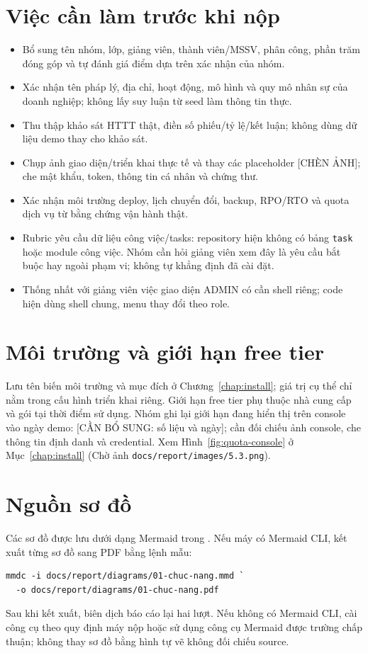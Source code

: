 \section{Việc cần làm trước khi nộp}
\begin{itemize}
\item Bổ sung tên nhóm, lớp, giảng viên, thành viên/MSSV, phân công, phần trăm đóng góp và tự đánh giá điểm dựa trên xác nhận của nhóm.
\item Xác nhận tên pháp lý, địa chỉ, hoạt động, mô hình và quy mô nhân sự của doanh nghiệp; không lấy suy luận từ seed làm thông tin thực.
\item Thu thập khảo sát HTTT thật, điền số phiếu/tỷ lệ/kết luận; không dùng dữ liệu demo thay cho khảo sát.
\item Chụp ảnh giao diện/triển khai thực tế và thay các placeholder [CHÈN ẢNH]; che mật khẩu, token, thông tin cá nhân và chứng thư.
\item Xác nhận môi trường deploy, lịch chuyển đổi, backup, RPO/RTO và quota dịch vụ từ bằng chứng vận hành thật.
\item Rubric yêu cầu dữ liệu công việc/tasks: repository hiện không có bảng \texttt{task} hoặc module công việc. Nhóm cần hỏi giảng viên xem đây là yêu cầu bắt buộc hay ngoài phạm vi; không tự khẳng định đã cài đặt.
\item Thống nhất với giảng viên việc giao diện ADMIN có cần shell riêng; code hiện dùng shell chung, menu thay đổi theo role.
\end{itemize}

\section{Môi trường và giới hạn free tier}
Lưu tên biến môi trường và mục đích ở Chương~\ref{chap:install}; giá trị cụ thể chỉ nằm trong cấu hình triển khai riêng. Giới hạn free tier phụ thuộc nhà cung cấp và gói tại thời điểm sử dụng. Nhóm ghi lại giới hạn đang hiển thị trên console vào ngày demo: [CẦN BỔ SUNG: số liệu và ngày]; cần đối chiếu ảnh console, che thông tin định danh và credential. Xem Hình~\ref{fig:quota-console} ở Mục~\ref{chap:install} (Chờ ảnh \texttt{docs/report/images/5.3.png}).

\section{Nguồn sơ đồ}
Các sơ đồ được lưu dưới dạng Mermaid trong \texttt{}. Nếu máy có Mermaid CLI, kết xuất từng sơ đồ sang PDF bằng lệnh mẫu:
\begin{verbatim}
mmdc -i docs/report/diagrams/01-chuc-nang.mmd `
  -o docs/report/diagrams/01-chuc-nang.pdf
\end{verbatim}
Sau khi kết xuất, biên dịch báo cáo lại hai lượt. Nếu không có Mermaid CLI, cài công cụ theo quy định máy nộp hoặc sử dụng công cụ Mermaid được trường chấp thuận; không thay sơ đồ bằng hình tự vẽ không đối chiếu source.

